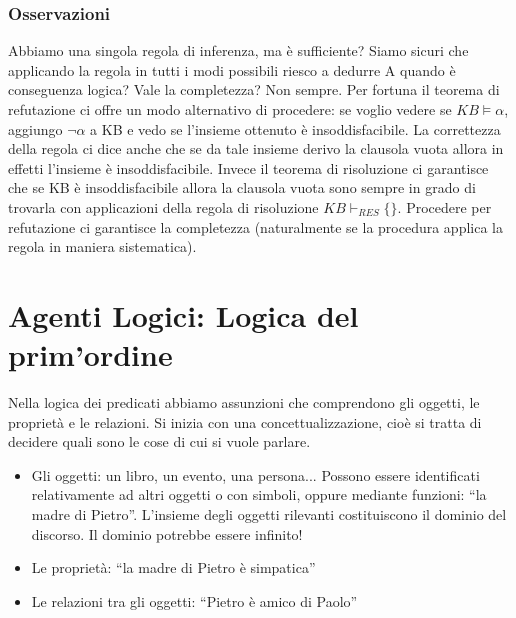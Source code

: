 \documentclass{article}
\begin{document}
\subsubsection{Osservazioni}
Abbiamo una singola regola di inferenza, ma è sufficiente? Siamo sicuri che applicando la regola in tutti i modi possibili riesco a dedurre A quando è conseguenza logica? Vale la completezza? Non sempre. \newline
Per fortuna il teorema di refutazione ci offre un modo alternativo di procedere: se voglio vedere se $KB \models \alpha$, aggiungo $\neg \alpha$ a KB e vedo se l’insieme ottenuto è insoddisfacibile. La correttezza della regola ci dice anche che se da tale insieme derivo la clausola vuota allora in effetti l’insieme è insoddisfacibile. Invece il teorema di risoluzione ci garantisce che se KB è insoddisfacibile allora la clausola vuota sono sempre in grado di trovarla con applicazioni della regola di risoluzione $KB \vdash _{RES} \{\}$. \newline 
Procedere per refutazione ci garantisce la completezza (naturalmente se la procedura applica la regola in maniera sistematica).

\section{Agenti Logici: Logica del prim'ordine}
Nella logica dei predicati abbiamo assunzioni che comprendono gli oggetti, le proprietà e le relazioni. Si inizia con una concettualizzazione, cioè si tratta di decidere quali sono le cose di cui si vuole parlare. 
\begin{itemize}
    \item Gli oggetti: un libro, un evento, una persona... Possono essere identificati relativamente ad altri oggetti o con simboli, oppure mediante funzioni: “la madre di Pietro”. L’insieme degli oggetti rilevanti costituiscono il dominio del discorso. Il dominio potrebbe essere infinito! 
    \item Le proprietà: “la madre di Pietro è simpatica”
    \item Le relazioni tra gli oggetti: “Pietro è amico di Paolo”
\end{itemize} 
\end{document}
